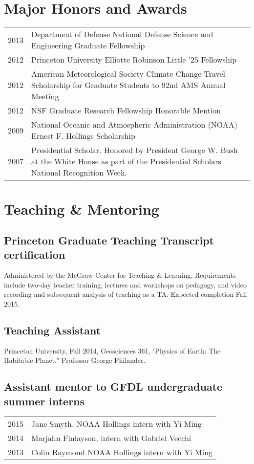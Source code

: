 \documentclass{article}
\begin{document}
\section*{Major Honors and Awards}
\label{sec-4}
\begin{center}
\begin{tabularx}{\textwidth}{lX}
2013 & Department of Defense National Defense Science and Engineering Graduate Fellowship\\
2012 & Princeton University Elliotte Robinson Little '25 Fellowship\\
2012 & American Meteorological Society Climate Change Travel Scholarship for Graduate Students to 92nd AMS Annual Meeting\\
2012 & NSF Graduate Research Fellowship Honorable Mention\\
2009 & National Oceanic and Atmospheric Administration (NOAA) Ernest F. Hollings Scholarship\\
2007 & Presidential Scholar.  Honored by President George W. Bush at the White House as part of the Presidential Scholars National Recognition Week.\\
\end{tabularx}
\end{center}
\section*{Teaching \& Mentoring}
\label{sec-5}
\subsection*{Princeton Graduate Teaching Transcript certification}
\label{sec-5-1}
Administered by the McGraw Center for Teaching \& Learning.  Requirements include
two-day teacher training, lectures and workshops on pedagogy, and video recording
and subsequent analysis of teaching as a TA.  Expected completion Fall 2015.
\subsection*{Teaching Assistant}
\label{sec-5-2}
Princeton University, Fall 2014, Geosciences 361, "Physics of Earth: The
Habitable Planet."  Professor George Philander.
\subsection*{Assistant mentor to GFDL undergraduate summer interns}
\label{sec-5-3}
\begin{center}
\begin{tabularx}{\textwidth}{lX}
2015 & Jane Smyth, NOAA Hollings intern with Yi Ming\\
2014 & Marjahn Finlayson, intern with Gabriel Vecchi\\
2013 & Colin Raymond NOAA Hollings intern with Yi Ming\\
\end{tabularx}
\end{center}
\end{document}
